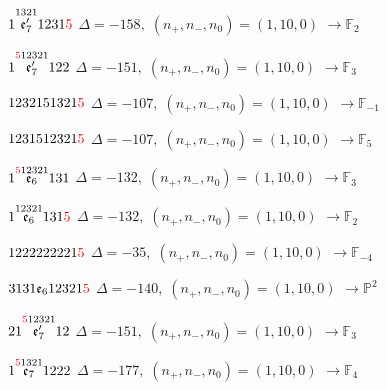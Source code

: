 \documentclass[10pt]{article}
\begin{document}
\smallskip

$1\overset{1321}{\mathfrak{e}_7'}1231\textcolor{red}{5}$ \quad $\Delta=-158,\; (n_+,n_-,n_0)=(1,10,0)$ \quad $\to \mathbb{F}_{2}$

\smallskip

$1\overset{\textcolor{red}{5}12321}{\mathfrak{e}_7'}122$ \quad $\Delta=-151,\; (n_+,n_-,n_0)=(1,10,0)$ \quad $\to \mathbb{F}_{3}$

\smallskip

$1232151321\textcolor{red}{5}$ \quad $\Delta=-107,\; (n_+,n_-,n_0)=(1,10,0)$ \quad $\to \mathbb{F}_{-1}$

$1231512321\textcolor{red}{5}$ \quad $\Delta=-107,\; (n_+,n_-,n_0)=(1,10,0)$ \quad $\to \mathbb{F}_{5}$

\smallskip

$1\overset{\textcolor{red}{5}12321}{\mathfrak{e}_6}131$ \quad $\Delta=-132,\; (n_+,n_-,n_0)=(1,10,0)$ \quad $\to \mathbb{F}_{3}$

$1\overset{12321}{\mathfrak{e}_6}131\textcolor{red}{5}$ \quad $\Delta=-132,\; (n_+,n_-,n_0)=(1,10,0)$ \quad $\to \mathbb{F}_{2}$

\smallskip

$1222222221\textcolor{red}{5}$ \quad $\Delta=-35,\; (n_+,n_-,n_0)=(1,10,0)$ \quad $\to \mathbb{F}_{-4}$

\smallskip

$3131\mathfrak{e}_612321\textcolor{red}{5}$ \quad $\Delta=-140,\; (n_+,n_-,n_0)=(1,10,0)$ \quad $\to \mathbb{P}^2$

\smallskip

$21\overset{\textcolor{red}{5}12321}{\mathfrak{e}_7'}12$ \quad $\Delta=-151,\; (n_+,n_-,n_0)=(1,10,0)$ \quad $\to \mathbb{F}_{3}$

\smallskip

$1\overset{\textcolor{red}{5}1321}{\mathfrak{e}_7}1222$ \quad $\Delta=-177,\; (n_+,n_-,n_0)=(1,10,0)$ \quad $\to \mathbb{F}_{4}$

\smallskip
\end{document}
